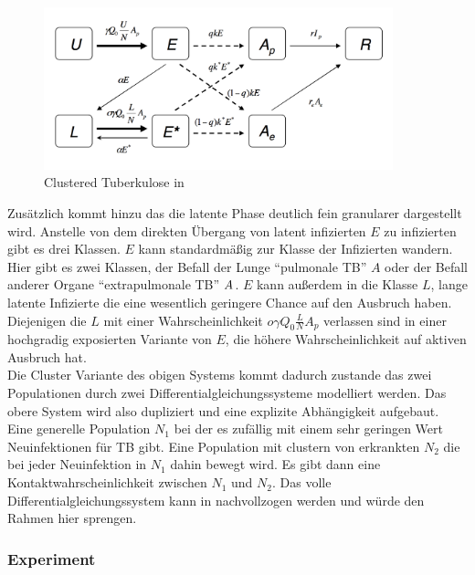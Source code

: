 \documentclass[paper=a4, fontsize=11pt, ngerman, abstract=on]{scrartcl}
\numberwithin{equation}{section} %
\numberwithin{figure}{section} %
\numberwithin{table}{section} %
\begin{document}
\begin{figure}[ht]
  \centering
  \includegraphics[width=0.9\textwidth,keepaspectratio]{images/clustered_seleir_model}
  \caption{Clustered Tuberkulose in \cite{ModellingTBEpidemics2009}}
  \label{fig:clustered-seleir}
\end{figure}

Zusätzlich kommt hinzu das die latente Phase deutlich fein granularer dargestellt wird. Anstelle von dem direkten Übergang von latent infizierten $E$ zu infizierten gibt es drei Klassen. $E$ kann standardmäßig zur Klasse der Infizierten wandern. Hier gibt es zwei Klassen, der Befall der Lunge ``pulmonale TB'' $A$ oder der Befall anderer Organe ``extrapulmonale TB'' $A^{\*}$. $E$ kann außerdem in die Klasse $L$, lange latente Infizierte die eine wesentlich geringere Chance auf den Ausbruch haben. Diejenigen die $L$ mit einer Wahrscheinlichkeit $o\gamma Q_{0}\frac{L}{N}A_{p}$ verlassen sind in einer hochgradig exposierten Variante von $E$, die höhere Wahrscheinlichkeit auf aktiven Ausbruch hat. \\

Die Cluster Variante des obigen Systems kommt dadurch zustande das zwei Populationen durch zwei Differentialgleichungssysteme modelliert werden. Das obere System wird also dupliziert und eine explizite Abhängigkeit aufgebaut. Eine generelle Population $N_{1}$ bei der es zufällig mit einem sehr geringen Wert Neuinfektionen für TB gibt. Eine Population mit clustern von erkrankten $N_{2}$ die bei jeder Neuinfektion in $N_{1}$ dahin bewegt wird. Es gibt dann eine Kontaktwahrscheinlichkeit zwischen $N_{1}$ und $N_{2}$. Das volle Differentialgleichungssystem kann in \cite{ModellingTBEpidemics2009} nachvollzogen werden und würde den Rahmen hier sprengen.

\subsubsection{Experiment}
\end{document}
